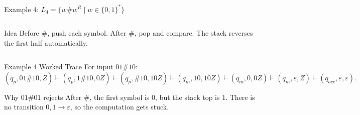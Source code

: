 \documentclass[aspectratio=169,10pt]{beamer}
\newcommand{\eps}{\varepsilon}
\newcommand{\turn}{\vdash}
\begin{document}
\begin{frame}{Example 4: \(L_4=\{w\#w^R\mid w\in\{0,1\}^*\}\)}
\small
\begin{columns}[T,onlytextwidth]
\begin{block}{Idea}
Before \(\#\), push each symbol.  After \(\#\), pop and compare.  The stack reverses the first half automatically.
\end{block}

\centering
{}
\end{columns}
\end{frame}

\begin{frame}{Example 4 Worked Trace}
\small
For input \(01\#10\):
\[
(q_p,01\#10,Z)
\turn(q_p,1\#10,0Z)
\turn(q_p,\#10,10Z)
\turn(q_m,10,10Z)
\turn(q_m,0,0Z)
\turn(q_m,\eps,Z)
\turn(q_{acc},\eps,\eps).
\]

\begin{alertblock}{Why \(01\#01\) rejects}
After \(\#\), the first symbol is \(0\), but the stack top is \(1\).  There is no transition \(0,1\to\eps\), so the computation gets stuck.
\end{alertblock}
\end{frame}
\end{document}
